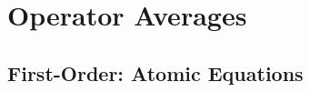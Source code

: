 \documentclass{article}
\begin{document}

\section{Operator Averages}

\subsection{First-Order: Atomic Equations}
\end{document}
